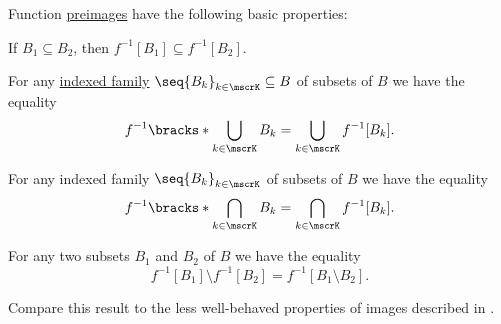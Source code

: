 \begin{proposition}\label{thm:function_preimage_properties}
  Function \hyperref[thm:function_properties/preimage]{preimages} have the following basic properties:
  \begin{thmenum}
     If \( B_1 \subseteq B_2 \), then \( f^{-1}[B_1] \subseteq f^{-1}[B_2] \).

     For any \hyperref[def:indexed_family]{indexed family} \( \seq{ B_k }_{k \in \mscrK} \subseteq B \) of subsets of \( B \) we have the equality
    \begin{equation}\label{eq:thm:function_preimage_properties/union}
      f^{-1}\bracks*{ \bigcup_{k \in \mscrK} B_k } = \bigcup_{k \in \mscrK} f^{-1}[B_k].
    \end{equation}

     For any indexed family \( \seq{ B_k }_{k \in \mscrK} \) of subsets of \( B \) we have the equality
    \begin{equation}\label{eq:thm:function_preimage_properties/intersection}
      f^{-1}\bracks*{ \bigcap_{k \in \mscrK} B_k } = \bigcap_{k \in \mscrK} f^{-1}[B_k].
    \end{equation}

     For any two subsets \( B_1 \) and \( B_2 \) of \( B \) we have the equality
    \begin{equation}\label{eq:thm:function_preimage_properties/difference}
      f^{-1}[B_1] \setminus f^{-1}[B_2] = f^{-1}[B_1 \setminus B_2].
    \end{equation}
  \end{thmenum}

  Compare this result to the less well-behaved properties of images described in .
\end{proposition}
